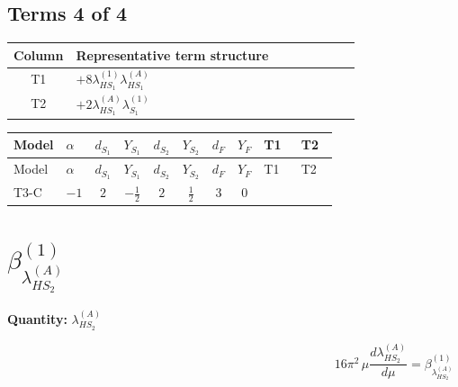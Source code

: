 \documentclass[8pt]{article}
\begin{document}
\begin{landscape}
\subsection*{Terms 4 of 4}
\begin{center}
\begin{tabular}{@{}c >{\raggedright\arraybackslash}p{0.82\linewidth}@{}}
\toprule
Column & Representative term structure \\
\midrule
T1 & \(\displaystyle +8 {\lambda_{HS_1}^{(1)}} {\lambda_{HS_1}^{(A)}}\) \\
\midrule
T2 & \(\displaystyle +2 {\lambda_{HS_1}^{(A)}} {\lambda_{S_1}^{(1)}}\) \\
\midrule
\bottomrule
\end{tabular}
\end{center}
\smallskip
\tiny
\begin{longtable}{@{}llcccccc >{\raggedright\arraybackslash}p{0.21\linewidth} >{\raggedright\arraybackslash}p{0.21\linewidth}@{}}
\toprule
Model & $\alpha$ & $d_{S_1}$ & $Y_{S_1}$ & $d_{S_2}$ & $Y_{S_2}$ & $d_F$ & $Y_F$ & T1 & T2 \\
\midrule
\endfirsthead
\toprule
Model & $\alpha$ & $d_{S_1}$ & $Y_{S_1}$ & $d_{S_2}$ & $Y_{S_2}$ & $d_F$ & $Y_F$ & T1 & T2 \\
\midrule
\endhead
T3-C & $-1$ & $2$ & $-\frac{1}{2}$ & $2$ & $\frac{1}{2}$ & $3$ & $0$ & \scriptsize\adjustbox{max width=\linewidth}{$\begin{gathered} +8 {\lambda_{HS_1}^{(1)}} {\lambda_{HS_1}^{(A)}}\end{gathered}$} & \scriptsize\adjustbox{max width=\linewidth}{$\begin{gathered} +2 {\lambda_{HS_1}^{(A)}} {\lambda_{S_1}^{(1)}}\end{gathered}$} \\
\midrule
\bottomrule
\end{longtable}
\clearpage
\section*{$\beta_{\lambda_{HS_2}^{(A)}}^{(1)}$}
\noindent\textbf{Quantity: }$\lambda_{HS_2}^{(A)}$\par\smallskip
\[16\pi^2\,\mu\frac{d \lambda_{HS_2}^{(A)}}{d\mu}=\beta_{\lambda_{HS_2}^{(A)}}^{(1)}\]

\end{landscape}
\end{document}
